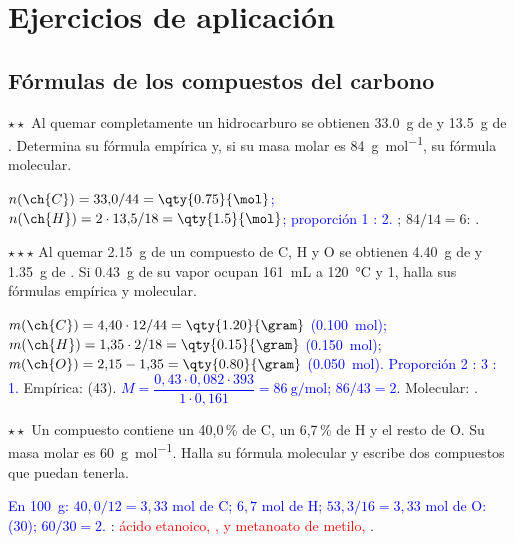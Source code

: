 \section{Ejercicios de aplicación}\label{sec:ud7-aplicacion}

\subsection{Fórmulas de los compuestos del carbono}

\begin{exercise}
    \(\star\star\) Al quemar completamente un hidrocarburo se obtienen \qty{33.0}{\gram} de  y \qty{13.5}{\gram} de
    . Determina su fórmula empírica y, si su masa molar es \qty{84}{\gram\per\mol}, su fórmula molecular.
    \begin{solu}
        \textcolor{blue}{\(n(\ch{C}) = 33{,}0/44 = \qty{0.75}{\mol}\); \(n(\ch{H}) = 2 \cdot 13{,}5/18 = \qty{1.5}{\mol}\); proporción
        1 : 2.} \textcolor{red}{}; \(84/14 = 6\): \textcolor{red}{}.
    \end{solu}
\end{exercise}

\begin{exercise}
    \(\star\star\star\) Al quemar \qty{2.15}{\gram} de un compuesto de C, H y O se obtienen \qty{4.40}{\gram} de  y
    \qty{1.35}{\gram} de . Si \qty{0.43}{\gram} de su vapor ocupan \qty{161}{\mL} a \qty{120}{\degreeCelsius} y
    \qty{1}{\atm}, halla sus fórmulas empírica y molecular.
    \begin{solu}
        \textcolor{blue}{\(m(\ch{C}) = 4{,}40 \cdot 12/44 = \qty{1.20}{\gram}\) (\qty{0.100}{\mol}); \(m(\ch{H}) = 1{,}35 \cdot 2/18 =
        \qty{0.15}{\gram}\) (\qty{0.150}{\mol}); \(m(\ch{O}) = 2{,}15 - 1{,}35 = \qty{0.80}{\gram}\) (\qty{0.050}{\mol}). Proporción
        2 : 3 : 1.} Empírica: \textcolor{red}{} (43). \textcolor{blue}{\(M = \dfrac{0{,}43 \cdot 0{,}082 \cdot 393}{1 \cdot
        0{,}161} = \qty{86}{\gram\per\mol}\); \(86/43 = 2\).} Molecular: \textcolor{red}{}.
    \end{solu}
\end{exercise}

\begin{exercise}
    \(\star\star\) Un compuesto contiene un 40,0\,\% de C, un 6,7\,\% de H y el resto de O. Su masa molar es
    \qty{60}{\gram\per\mol}. Halla su fórmula molecular y escribe dos compuestos que puedan tenerla.
    \begin{solu}
        \textcolor{blue}{En \qty{100}{\gram}: \(40{,}0/12 = 3{,}33\) mol de C; \(6{,}7\) mol de H; \(53{,}3/16 = 3{,}33\) mol de O:
         (30); \(60/30 = 2\).} \textcolor{red}{}: \textcolor{red}{ácido etanoico, , y metanoato de
        metilo, }.
    \end{solu}
\end{exercise}

